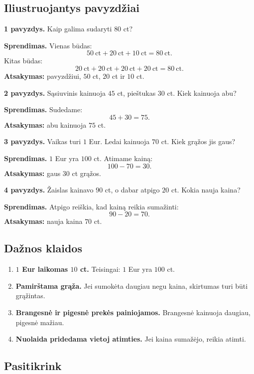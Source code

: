 \subsection{Iliustruojantys pavyzdžiai}

\textbf{1 pavyzdys.} Kaip galima sudaryti \(80\) ct?

\textbf{Sprendimas.} Vienas būdas:
\[
50\ \text{ct}+20\ \text{ct}+10\ \text{ct}=80\ \text{ct}.
\]
Kitas būdas:
\[
20\ \text{ct}+20\ \text{ct}+20\ \text{ct}+20\ \text{ct}=80\ \text{ct}.
\]
\textbf{Atsakymas:} pavyzdžiui, \(50\) ct, \(20\) ct ir \(10\) ct.

\textbf{2 pavyzdys.} Sąsiuvinis kainuoja \(45\) ct, pieštukas \(30\) ct. Kiek kainuoja abu?

\textbf{Sprendimas.} Sudedame:
\[
45+30=75.
\]
\textbf{Atsakymas:} abu kainuoja \(75\) ct.

\textbf{3 pavyzdys.} Vaikas turi \(1\) Eur. Ledai kainuoja \(70\) ct. Kiek grąžos jis gaus?

\textbf{Sprendimas.} \(1\) Eur yra \(100\) ct. Atimame kainą:
\[
100-70=30.
\]
\textbf{Atsakymas:} gaus \(30\) ct grąžos.

\textbf{4 pavyzdys.} Žaislas kainavo \(90\) ct, o dabar atpigo \(20\) ct. Kokia nauja kaina?

\textbf{Sprendimas.} Atpigo reiškia, kad kainą reikia sumažinti:
\[
90-20=70.
\]
\textbf{Atsakymas:} nauja kaina \(70\) ct.

\subsection{Dažnos klaidos}

\begin{enumerate}
\item \textbf{\(1\) Eur laikomas \(10\) ct.} Teisingai: \(1\) Eur yra \(100\) ct.
\item \textbf{Pamirštama grąža.} Jei sumokėta daugiau negu kaina, skirtumas turi būti grąžintas.
\item \textbf{Brangesnė ir pigesnė prekės painiojamos.} Brangesnė kainuoja daugiau, pigesnė mažiau.
\item \textbf{Nuolaida pridedama vietoj atimties.} Jei kaina sumažėjo, reikia atimti.
\end{enumerate}

\subsection{Pasitikrink}


